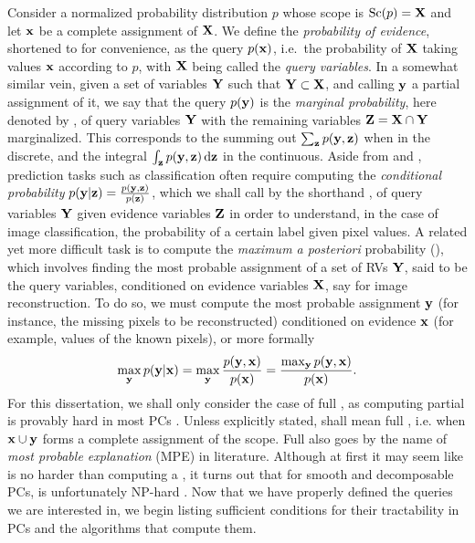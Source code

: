 Consider a normalized probability distribution $p$ whose scope is $\operatorname*{\normalfont{Sc}}(p)=\mathbf{X}$ and let
$\mathbf{x}$ be a complete assignment of $\mathbf{X}$. We define the \emph{probability of evidence},
shortened to \evi{} for convenience, as the query $p(\mathbf{x})$, i.e.\ the probability of $\mathbf{X}$
taking values $\mathbf{x}$ according to $p$, with $\mathbf{X}$ being called the \emph{query variables}.
In a somewhat similar vein, given a set of variables $\mathbf{Y}$ such that $\mathbf{Y}\subset\mathbf{X}$,
and calling $\mathbf{y}$ a partial assignment of it, we say that the query $p(\mathbf{y})$ is the
\emph{marginal probability}, here denoted by \mar{}, of query variables $\mathbf{Y}$ with the
remaining variables $\mathbf{Z}=\mathbf{X}\cap \mathbf{Y}$ marginalized. This corresponds to the summing out
$\sum_{\mathbf{z}}p(\mathbf{y}, \mathbf{z})$ when in the discrete, and the integral
$\int_{\mathbf{z}}p(\mathbf{y},\mathbf{z})\mathop{}\!\mathrm{d}\mathbf{z}$ in the continuous. Aside from \evi{} and \mar{},
prediction tasks such as classification often require computing the \emph{conditional probability}
$p(\mathbf{y}|\mathbf{z})=\frac{p(\mathbf{y},\mathbf{z})}{p(\mathbf{z})}$, which we shall call by the shorthand
\con{}, of query variables $\mathbf{Y}$ given evidence variables $\mathbf{Z}$ in order to understand, in
the case of image classification, the probability of a certain label given pixel values. A related
yet more difficult task is to compute the \emph{maximum a posteriori} probability (\map{}), which
involves finding the most probable assignment of a set of RVs $\mathbf{Y}$, said to be the query
variables, conditioned on evidence variables $\mathbf{X}$, say for image reconstruction. To do so, we
must compute the most probable assignment $\mathbf{y}$ (for instance, the missing pixels to be
reconstructed) conditioned on evidence $\mathbf{x}$ (for example, values of the known pixels), or more
formally
\begin{equation}
  \max_{\mathbf{y}}p(\mathbf{y}|\mathbf{x})=\max_{\mathbf{y}}\frac{p(\mathbf{y},\mathbf{x})}{p(\mathbf{x})}=
  \frac{\max_{\mathbf{y}}p(\mathbf{y},\mathbf{x})}{p(\mathbf{x})}.
  \label{eq:map}
\end{equation}
For this dissertation, we shall only consider the case of full \map{}, as computing partial \map{}
is provably hard in most PCs \citep{peharz16,decampos11}.  Unless explicitly stated, \map{} shall
mean full \map{}, i.e. when $\mathbf{x}\cup\mathbf{y}$ forms a complete assignment of the scope. Full
\map{} also goes by the name of \emph{most probable explanation} (MPE) in literature.  Although at
first it may seem like \map{} is no harder than computing a \con{}, it turns out that for smooth
and decomposable PCs, \map{} is unfortunately NP-hard \citep{conaty17,mei18}. Now that we have
properly defined the queries we are interested in, we begin listing sufficient conditions for their
tractability in PCs and the algorithms that compute them.

